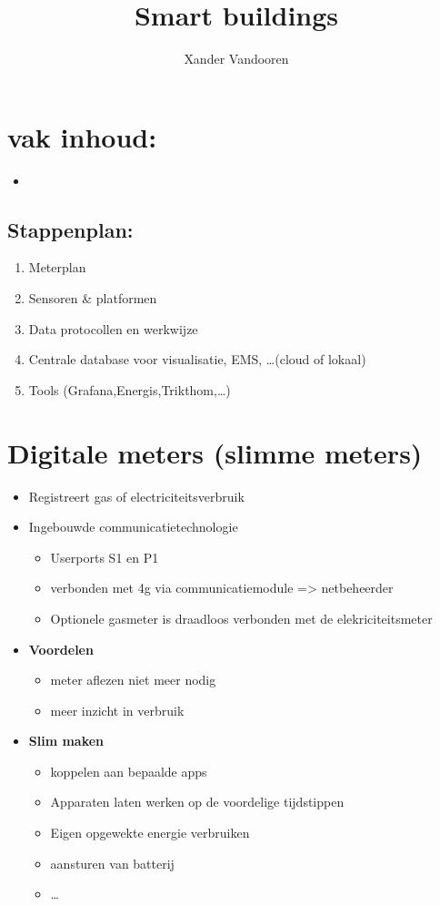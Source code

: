 \documentclass[12pt]{article}
\begin{document}
\begin{titlepage}
    \author{Xander Vandooren}
    \title{Smart buildings}
\end{titlepage}
\maketitle
\newpage
\tableofcontents
\newpage
{}
\section{vak inhoud:}
\begin{itemize}
    \item[] 
\end{itemize}
\subsection{Stappenplan:}
\begin{enumerate}
    \item Meterplan
    \item Sensoren \& platformen
    \item Data protocollen en werkwijze
    \item Centrale database voor visualisatie, EMS, \dots (cloud of lokaal)
    \item Tools (Grafana,Energis,Trikthom,\dots)
\end{enumerate}
\section{Digitale meters (slimme meters)}
\begin{itemize}
    \item Registreert gas of electriciteitsverbruik
    \item Ingebouwde communicatietechnologie\begin{itemize}
        \item Userports S1 en P1
        \item verbonden met 4g via communicatiemodule => netbeheerder
        \item Optionele gasmeter is draadloos verbonden met de elekriciteitsmeter
    \end{itemize}
    \item\textbf{Voordelen}\begin{itemize}
        \item meter aflezen niet meer nodig
        \item meer inzicht in verbruik
    \end{itemize}
    \item\textbf{Slim maken}\begin{itemize}
        \item koppelen aan bepaalde apps
        \item Apparaten laten werken op de voordelige tijdstippen
        \item Eigen opgewekte energie verbruiken
        \item aansturen van batterij
        \item \dots
    \end{itemize}
\end{itemize}
\end{document}
